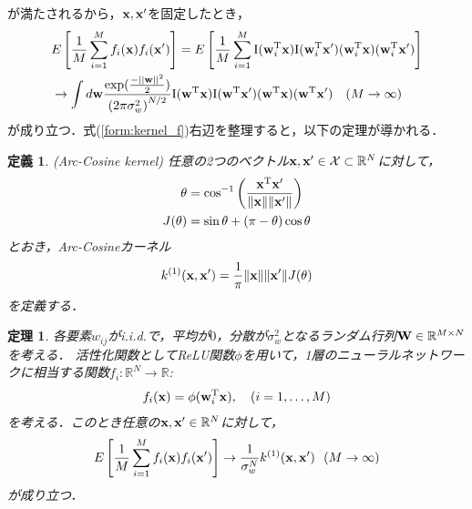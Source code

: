 \documentclass[11pt,a4j]{article}
\newtheorem{dfn}{定義}
\newtheorem{thm}{定理}
\begin{document}
        が満たされるから，${\bf x}, {\bf x}'$を固定したとき，
        \begin{align}
          &E\left[ \frac{1}{M} \sum_{i=1}^{M} {f_i ({\bf x})} f_i ({\bf x}') \right] 
          = E\left[ \frac{1}{M} \sum_{i=1}^{M} {\mathrm{I}}( {\bf w}_{i}^{\mathrm{T}} {\bf x} ) {\mathrm{I}}( {\bf w}_{i}^{\mathrm{T}} {\bf x}' ) 
          ( {\bf w}_{i}^{\mathrm{T}} {\bf x} ) ( {\bf w}_{i}^{\mathrm{T}} {\bf x}' ) \right] \nonumber \\
          &\to \int d{\bf w} \frac{\exp (\frac{- {|| {\bf w} ||}^2}{2})}{{(2 \pi \sigma_w^2 )}^{N / 2}}
          {\mathrm{I}}( {\bf w}^{\mathrm{T}} {\bf x} ) {\mathrm{I}}( {\bf w}^{\mathrm{T}} {\bf x}' ) 
          ( {\bf w}^{\mathrm{T}} {\bf x} ) ( {\bf w}^{\mathrm{T}} {\bf x}' ) ~~~ (M \to \infty) \label{form:kernel_f} 
        \end{align}
        が成り立つ．式(\ref{form:kernel_f})右辺を整理すると，以下の定理が導かれる．

        \begin{dfn}
          (Arc-Cosine kernel)
          任意の2つのベクトル${\bf x}, {\bf x}' \in \mathcal{X} \subset \mathbb{R}^{N}$に対して，
          \begin{align}
            \theta &= {\cos}^{-1} \left( \frac{{\bf x}^{\mathrm{T}} {\bf x}'}{ \|{\bf x}\| \|{\bf x}'\| } \right) \\
            J(\theta) &= \sin \theta + (\pi - \theta) \cos \theta
          \end{align}
          とおき，Arc-Cosineカーネル
          \begin{align}
            k^{(1)}({\bf x}, {\bf x}') = \frac{1}{\pi} \| {\bf x} \| \| {\bf x}' \| J(\theta) 
          \end{align}
          を定義する．
        \end{dfn}

        \begin{thm}\label{thm:clt_dnn}
          各要素$w_{ij}$がi.i.d.で，平均が$0$，分散が$\sigma_w^2$となるランダム行列${\bf W} \in \mathbb{R}^{M \times N}$を考える．
          活性化関数としてReLU関数$\phi$を用いて，1層のニューラルネットワークに相当する関数$f_i:\mathbb{R}^{N} \to \mathbb{R}$:
          \begin{align}
            f_i({\bf x}) = \phi({\bf w}_i^{\mathrm{T}} {\bf x}), ~~~ (i=1 ,\dots, M)
          \end{align}
          を考える．このとき任意の${\bf x}, {\bf x}' \in \mathbb{R}^{N}$に対して，
          \begin{align}
            E \left[ \frac{1}{M} \sum_{i=1}^{M} f_i({\bf x}) f_i({\bf x}') \right] \to
            \frac{1}{\sigma_w^N} k^{(1)}({\bf x}, {\bf x}') ~~ (M \to \infty)
          \end{align}
          が成り立つ．
        \end{thm}
\end{document}
